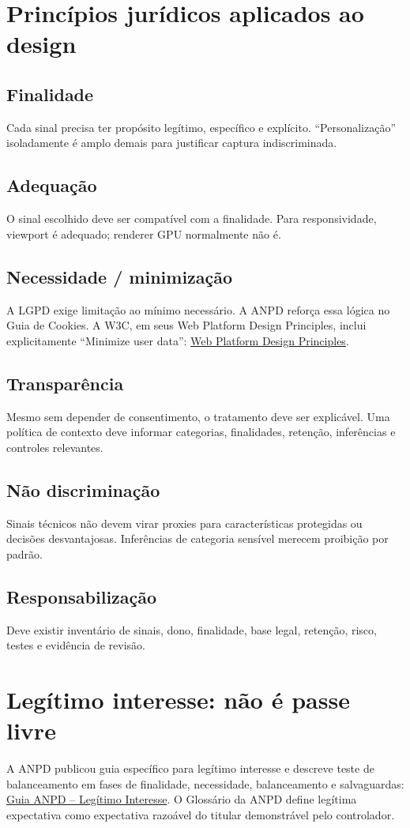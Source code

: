 \documentclass[11pt,a4paper]{article}
\begin{document}
\section{Princípios jurídicos aplicados ao design}
\subsection{Finalidade}
Cada sinal precisa ter propósito legítimo, específico e explícito. ``Personalização'' isoladamente é amplo demais para justificar captura indiscriminada.

\subsection{Adequação}
O sinal escolhido deve ser compatível com a finalidade. Para responsividade, viewport é adequado; renderer GPU normalmente não é.

\subsection{Necessidade / minimização}
A LGPD exige limitação ao mínimo necessário. A ANPD reforça essa lógica no Guia de Cookies. A W3C, em seus Web Platform Design Principles, inclui explicitamente ``Minimize user data'': \href{https://www.w3.org/TR/design-principles/}{Web Platform Design Principles}.

\subsection{Transparência}
Mesmo sem depender de consentimento, o tratamento deve ser explicável. Uma política de contexto deve informar categorias, finalidades, retenção, inferências e controles relevantes.

\subsection{Não discriminação}
Sinais técnicos não devem virar proxies para características protegidas ou decisões desvantajosas. Inferências de categoria sensível merecem proibição por padrão.

\subsection{Responsabilização}
Deve existir inventário de sinais, dono, finalidade, base legal, retenção, risco, testes e evidência de revisão.

\section{Legítimo interesse: não é passe livre}
A ANPD publicou guia específico para legítimo interesse e descreve teste de balanceamento em fases de finalidade, necessidade, balanceamento e salvaguardas: \href{https://www.gov.br/anpd/pt-br/centrais-de-conteudo/materiais-educativos-e-publicacoes/guia_orientativo_hipoteses_legais_tratamento_de_dados_pessoais_legitimo_interesse}{Guia ANPD -- Legítimo Interesse}. O Glossário da ANPD define legítima expectativa como expectativa razoável do titular demonstrável pelo controlador.
\end{document}
